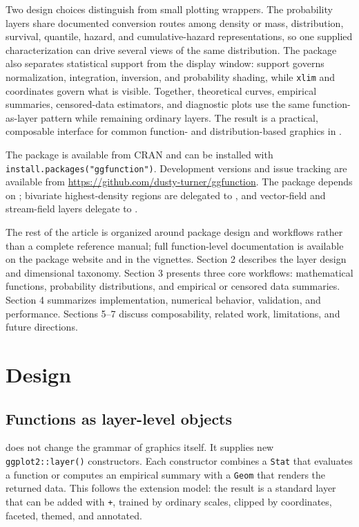 Two design choices distinguish  from small plotting wrappers.
The probability layers share documented conversion routes among density or
mass, distribution, survival, quantile, hazard, and cumulative-hazard
representations, so one supplied characterization can drive several views of
the same distribution. The package also separates statistical support from the
display window: support governs normalization, integration, inversion, and
probability shading, while \texttt{xlim} and coordinates govern what is visible.
Together, theoretical curves, empirical summaries, censored-data estimators,
and diagnostic plots use the same function-as-layer pattern while remaining
ordinary  layers. The result is a practical, composable
interface for common function- and distribution-based graphics in .

The package is available from CRAN and can be installed with
\texttt{install.packages("ggfunction")}. Development versions and issue tracking are
available from \url{https://github.com/dusty-turner/ggfunction}. The package
depends on ; bivariate highest-density regions are delegated
to  \citep{otto2023ggdensity}, and vector-field and stream-field
layers delegate to  \citep{ggvfields}.

The rest of the article is organized around package design and workflows rather than a complete reference manual; full function-level documentation is available on the package website and in the vignettes. Section 2 describes the layer design and
dimensional taxonomy. Section 3 presents three core workflows: mathematical
functions, probability distributions, and empirical or censored data summaries.
Section 4 summarizes implementation, numerical behavior, validation, and
performance. Sections 5--7 discuss composability, related work, limitations, and
future directions.

\section{Design}\label{design}

\subsection{Functions as layer-level objects}\label{functions-as-layer-level-objects}

 does not change the grammar of graphics itself. It supplies new
\texttt{ggplot2::layer()} constructors. Each constructor combines a \texttt{Stat}
that evaluates a function or computes an empirical summary with a \texttt{Geom}
that renders the returned data. This follows the  extension
model: the result is a standard layer that can be added with \texttt{+}, trained
by ordinary scales, clipped by coordinates, faceted, themed, and annotated.

